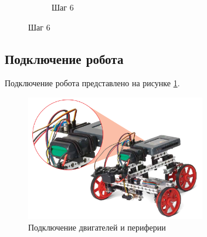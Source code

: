 \begin{figure}[h]
\begin{subfigure}[b]{0.45\textwidth}
        \caption*{Шаг 6}
    \end{subfigure}
\end{figure}

\newpage
\subsection{Подключение робота}
Подключение робота представлено на рисунке \ref{1connect}.
\begin{figure}[h]
    \centering
    \includegraphics[width=0.7\textwidth]{fig/assembly/1.7.png}
    \caption{Подключение двигателей и периферии}
    \label{1connect}
\end{figure}


